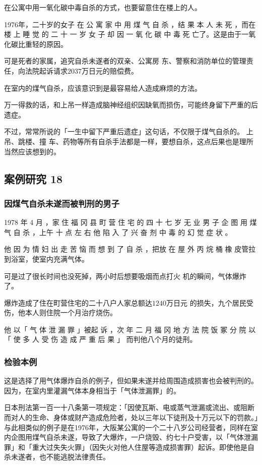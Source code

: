 \documentclass[UTF8]{ctexart}
\begin{document}
在公寓中用一氧化碳中毒自杀的方式，也要留意住在楼上的人。

1976年，二十岁的女子 在 公 寓 家 中 用 煤 气 自 杀 ，结 果 本 人 未 死 ，而在 楼 上 睡 觉 的 二 十 一 岁 女 子 却 因 一 氧 化 碳 中 毒 死 亡了。这是由于一氧化碳比重轻的原因。

可是死者的家属，追究自杀未遂者的双亲、公寓房 东、警察和消防单位的管理责任，向法院起诉请求$2037$万日元的赔偿费。

在室内的煤气自杀，应该意识到是最容易给人造成麻烦的方法。

万一得救的话，和上吊一样造成脑神经组织因缺氧而损伤，可能终身留下严重的后遗症。

不过，常常所说的「一生中留下严重后遗症」这句话，不仅限于煤气自杀的。
上吊、跳楼、撞 车、药物等所有自杀手法都是一样，要想自杀，这点后果也是理所当然应该想到的。


\subsection{案例研究 18}

\subsubsection*{因煤气自杀未遂而被判刑的男子}

1978 年 4 月 ，家 住 福 冈 县 町 营 住 宅 的 四 十 七 岁 无 业 男 子 企 图 用 煤 气 自 杀 ，上午 十 点 左 右 他 陷 入 了 兴 奋 剂 中 毒 的 幻 觉 症 状 。

他 因 为 情 妇 出 走 苦 恼 而 想 到 了 自 杀 ，把放 在 屋 外 丙 烷 桶 橡 皮管拉到浴室，使室内充满气体。

可是过了很长时间也没死掉，两小时后想要吸烟而点打火 机的瞬间，气体爆炸了。

爆炸造成了住在町营住宅的二十八户人家总额达$1240$万日元 的损失，九个居民受伤，他本人则住院一个月治疗烧伤。 

他 以「 气 体 泄 漏 罪 」被起 诉 ，次 年 二 月 福 冈 地 方 法 院 饭 冢 分 院 以「 使 多 人 受 伤 造 成 严 重 后 果 」 而判他八个月的徒刑。

\subsubsection*{检验本例}

这是选择了用气体爆炸自杀的例子，但如果未遂并给周围造成损害也会被判刑的。
因为，在室内里灌漏气体本身相当于「气体泄漏罪」的。

日本刑法第一百一十八条第一项规定：「因使瓦斯、电或蒸气泄漏或流出、或阻断而对人的生命、身体或财产造成危险者，处以三年以下徒刑及十万元以下的罚款。」与此相类似的例子是在1976年，大阪某公寓的一个二十八岁公司经营者，同样在室内企图用煤气自杀未遂，导致了大爆炸，一户烧毁、约七十户受害，以「气体泄漏罪」和「重大过失失火罪」（因失火对他人住屋等造成损害罪）起诉。即使他是自杀未遂者，也不能逃脱法律责任。
\end{document}
